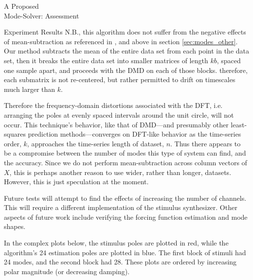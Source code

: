 \documentclass[a4paper,10pt]{report}
\numberwithin{equation}{section}
\begin{document}
\begin{chapter}{A Proposed \\Mode-Solver: Assessment}
\begin{section}{Experiment Results}
N.B., this algorithm does not suffer from the negative effects of mean-subtraction as referenced in \cite{Chen2012}, and above in section \ref{sec:modes_other}. Our method subtracts the mean of the entire data set from each point in the data set, then it breaks the entire data set into smaller matrices of length $kb$, spaced one sample apart, and proceeds with the DMD on each of those blocks. therefore, each submatrix is not re-centered, but rather permitted to drift on timescales much larger than $k$.

Therefore the frequency-domain distortions associated with the DFT, i.e. arranging the poles at evenly spaced intervals around the unit circle, will not occur. This technique's behavior, like that of DMD---and presumably other least-squares prediction methods---converges on DFT-like behavior as the time-series order, $k$, approaches the time-series length of dataset, $n$. Thus there appears to be a compromise between the number of modes this type of system can find, and the accuracy. Since we do not perform mean-subtraction across column vectors of $X$, this is perhaps another reason to use wider, rather than longer, datasets. However, this is just speculation at the moment.

Future tests will attempt to find the effects of increasing the number of channels. This will require a different implementation of the stimulus synthesizer. Other aspects of future work include verifying the forcing function estimation and mode shapes. 

In the complex plots below, the stimulus poles are plotted in red, while the algorithm's 24 estimation poles are plotted in blue. The first block of stimuli had 24 modes, and the second block had 28. These plots are ordered by increasing polar magnitude (or decreasing damping).


\end{section}
\end{chapter}
\end{document}
